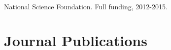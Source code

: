 \documentclass[letterpaper]{deedy-resume} %
\newcommand\Tstrut{\rule{0pt}{2.6ex}}         %
\begin{document}
{\begin{etaremune}[itemsep=0.1cm]
\item {{} National Science Foundation. Full funding, 2012-2015.}

\end{etaremune}

%
% 



\section{Journal Publications}
\vspace{0.2cm}

}
\end{document}

